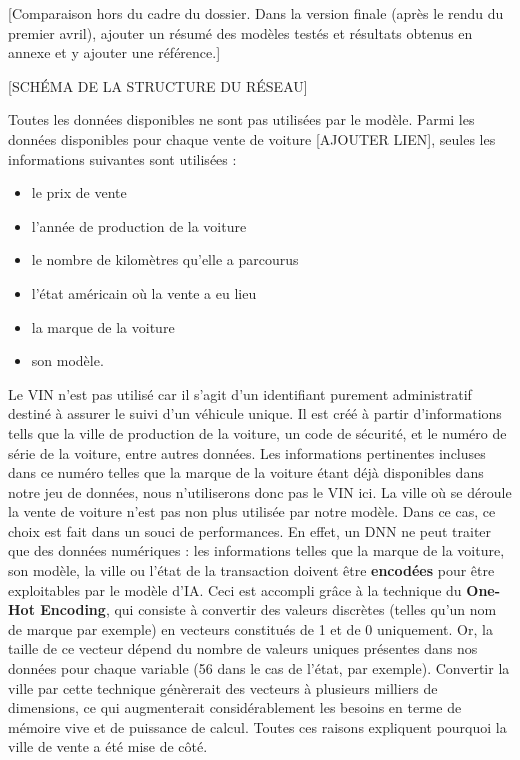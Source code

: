 \documentclass[french]{article}
\begin{document}
    [Comparaison hors du cadre du dossier. Dans la version finale (après le rendu du premier avril), ajouter un résumé des modèles testés et résultats obtenus en annexe et y ajouter une référence.]
    
    [SCHÉMA DE LA STRUCTURE DU RÉSEAU]

    Toutes les données disponibles ne sont pas utilisées par le modèle. Parmi les données disponibles pour chaque vente de voiture [AJOUTER LIEN], seules les informations suivantes sont utilisées :
    \begin{itemize}
        \item le prix de vente
        \item l'année de production de la voiture
        \item le nombre de kilomètres qu'elle a parcourus
        \item l'état américain où la vente a eu lieu
        \item la marque de la voiture
        \item son modèle.
    \end{itemize}
    Le VIN n'est pas utilisé car il s'agit d'un identifiant purement administratif destiné à assurer le suivi d'un véhicule unique. Il est créé à partir d'informations tells que la ville de production de la voiture, un code de sécurité, et le numéro de série de la voiture, entre autres données. Les informations pertinentes incluses dans ce numéro telles que la marque de la voiture étant déjà disponibles dans notre jeu de données, nous n'utiliserons donc pas le VIN ici.
    La ville où se déroule la vente de voiture n'est pas non plus utilisée par notre modèle. Dans ce cas, ce choix est fait dans un souci de performances. En effet, un DNN ne peut traiter que des données numériques : les informations telles que la marque de la voiture, son modèle, la ville ou l'état de la transaction doivent être \textbf{encodées} pour être exploitables par le modèle d'IA. Ceci est accompli grâce à la technique du \textbf{One-Hot Encoding}, qui consiste à convertir des valeurs discrètes (telles qu'un nom de marque par exemple) en vecteurs constitués de 1 et de 0 uniquement. Or, la taille de ce vecteur dépend du nombre de valeurs uniques présentes dans nos données pour chaque variable (56 dans le cas de l'état, par exemple). Convertir la ville par cette technique génèrerait des vecteurs à plusieurs milliers de dimensions, ce qui augmenterait considérablement les besoins en terme de mémoire vive et de puissance de calcul. Toutes ces raisons expliquent pourquoi la ville de vente a été mise de côté.
    
\end{document}

